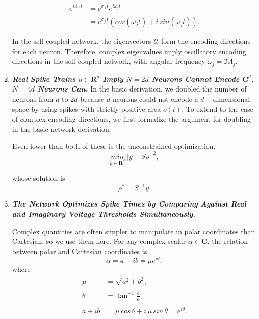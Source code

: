 \begin{enumerate}
\begin{align*}
e^{i \Lambda_j \, t} 
&=
e^{\sigma_j \, t} e^{i \omega_j t}
\\
\\
&=
e^{\sigma_j \, t} \left(cos(\omega_j t) + i \, sin(\omega_j t)\right).
\end{align*}

In the self-coupled network, the eigenvectors $\mathcal{U}$ form the encoding directions for each neuron. Therefore, complex eigenvalues imply oscillatory encoding directions in the self coupled network, with angular frequency $\omega_j = \Im \Lambda_j$. 

 

\item \textbf{\textit{Real Spike Trains $\tilde{o} \in \mathbf{R}^d$ Imply $N = 2d$ Neurons Cannot Encode $\mathbf{C}^d$. $N = 4d$ Neurons Can.}} In the basic derivation, we doubled the number of neurons from $d$ to $2d$ because $d$ neurons could not encode a $d-$dimensional space by using spikes with strictly positive area $o(t)$. To extend to the case of complex encoding directions, we first formalize the argument for doubling in the basic network derivation. 









 Even lower than both of these is the unconstrained optimization, 
$$
\underset{\rho \in \mathbf{R}^{d}}{min} ||y - S \rho ||^2, 
$$

whose solution is 
$$
\rho^* = S^{-1}y. 
$$


\item\textbf{\textit{The Network Optimizes Spike Times by Comparing Against Real and Imaginary Voltage Thresholds Simultaneously.}}



Complex quantities are often simpler to manipulate in polar coordinates than Cartesian, so we use them here. For any complex scalar $\alpha \in \mathbf{C}$, the relation between polar and Cartesian coordinates is
$$
\alpha = a + i b = \mu e^{i \theta}, 
$$
where
\begin{align*}
\mu &= \sqrt{a^2 + b^2}, 
\\
\\
\theta &= \tan^{-1}\frac{b}{a},
\\
\\
a + ib &= \mu \, cos \,\theta + i \, \mu \,  sin \, \theta = e^{i\theta}.
\end{align*}


\end{enumerate}
